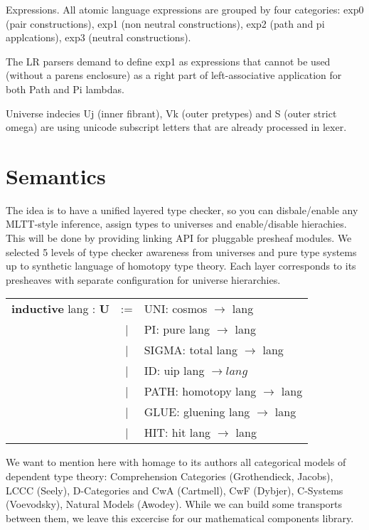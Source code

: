 \documentclass[a4paper,UKenglish,cleveref, autoref, thm-restate]{lipics-v2021}
\begin{document}
Expressions. All atomic language expressions are grouped by four categories: exp0 (pair constructions), exp1 (non neutral constructions), exp2 (path and pi applcations), exp3 (neutral constructions).

The LR parsers demand to define exp1 as expressions that cannot be used (without a parens enclosure) as a right part of left-associative application for both Path and Pi lambdas.

Universe indecies Uj (inner fibrant), Vk (outer pretypes) and S (outer strict omega) are using unicode subscript letters that are already processed in lexer.

\section{Semantics}

The idea is to have a unified layered type checker, so you can disbale/enable any MLTT-style inference, assign types to universes and enable/disable hierachies. This will be done by providing linking API for pluggable presheaf modules. We selected 5 levels of type checker awareness from universes and pure type systems up to synthetic language of homotopy type theory. Each layer corresponds to its presheaves with separate configuration for universe hierarchies.


\begin{table}[ht]
\begin{tabular}{rcl}
 \textbf{inductive} lang : \textbf{U} & := & UNI: cosmos $\rightarrow$ lang \\
   & | & PI: pure lang $\rightarrow$ lang \\
   & | & SIGMA: total lang $\rightarrow$ lang \\
   & | & ID: uip lang $\rightarrow lang$ \\
   & | & PATH: homotopy lang $\rightarrow$ lang \\
   & | & GLUE: gluening lang $\rightarrow$ lang \\
   & | & HIT: hit lang $\rightarrow$ lang \\
\end{tabular}
\end{table}

We want to mention here with homage to its authors all categorical models of dependent type theory: Comprehension Categories (Grothendieck, Jacobs), LCCC (Seely), D-Categories and CwA (Cartmell), CwF (Dybjer), C-Systems (Voevodsky), Natural Models (Awodey). While we can build some transports between them, we leave this excercise for our mathematical components library.
\end{document}
